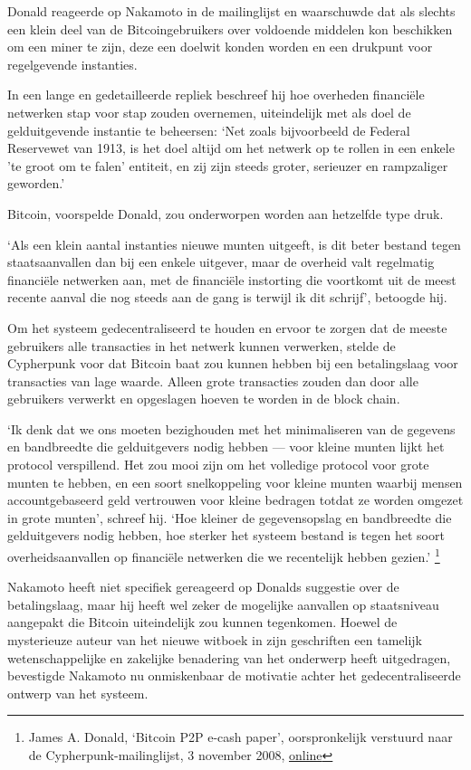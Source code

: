 \documentclass[
  a5paper,
  smalldemyvopaper,11pt,twoside,onecolumn,openright,extrafontsizes]{memoir}
\begin{document}
Donald reageerde op Nakamoto in de mailinglijst en waarschuwde dat als
slechts een klein deel van de Bitcoingebruikers over voldoende middelen
kon beschikken om een miner te zijn, deze een doelwit konden worden en
een drukpunt voor regelgevende instanties.

In een lange en gedetailleerde repliek beschreef hij hoe overheden
financiële netwerken stap voor stap zouden overnemen, uiteindelijk met
als doel de gelduitgevende instantie te beheersen: `Net zoals
bijvoorbeeld de Federal Reservewet van 1913, is het doel altijd om het
netwerk op te rollen in een enkele 'te groot om te falen' entiteit, en
zij zijn steeds groter, serieuzer en rampzaliger geworden.'

Bitcoin, voorspelde Donald, zou onderworpen worden aan hetzelfde type
druk.

`Als een klein aantal instanties nieuwe munten uitgeeft, is dit beter
bestand tegen staatsaanvallen dan bij een enkele uitgever, maar de
overheid valt regelmatig financiële netwerken aan, met de financiële
instorting die voortkomt uit de meest recente aanval die nog steeds aan
de gang is terwijl ik dit schrijf', betoogde hij.

Om het systeem gedecentraliseerd te houden en ervoor te zorgen dat de
meeste gebruikers alle transacties in het netwerk kunnen verwerken,
stelde de Cypherpunk voor dat Bitcoin baat zou kunnen hebben bij een
betalingslaag voor transacties van lage waarde. Alleen grote transacties
zouden dan door alle gebruikers verwerkt en opgeslagen hoeven te worden
in de block chain.

`Ik denk dat we ons moeten bezighouden met het minimaliseren van de
gegevens en bandbreedte die gelduitgevers nodig hebben --- voor kleine
munten lijkt het protocol verspillend. Het zou mooi zijn om het
volledige protocol voor grote munten te hebben, en een soort
snelkoppeling voor kleine munten waarbij mensen accountgebaseerd geld
vertrouwen voor kleine bedragen totdat ze worden omgezet in grote
munten', schreef hij. `Hoe kleiner de gegevensopslag en bandbreedte die
gelduitgevers nodig hebben, hoe sterker het systeem bestand is tegen het
soort overheidsaanvallen op financiële netwerken die we recentelijk
hebben gezien.' \footnote{James A. Donald, `Bitcoin P2P e-cash paper',
  oorspronkelijk verstuurd naar de Cypherpunk-mailinglijst, 3 november
  2008,
  \href{https://www.metzdowd.com/pipermail/cryptography/2008-November/014819.html}{online}}

Nakamoto heeft niet specifiek gereageerd op Donalds suggestie over de
betalingslaag, maar hij heeft wel zeker de mogelijke aanvallen op
staatsniveau aangepakt die Bitcoin uiteindelijk zou kunnen tegenkomen.
Hoewel de mysterieuze auteur van het nieuwe witboek in zijn geschriften
een tamelijk wetenschappelijke en zakelijke benadering van het onderwerp
heeft uitgedragen, bevestigde Nakamoto nu onmiskenbaar de motivatie
achter het gedecentraliseerde ontwerp van het systeem.
\end{document}
